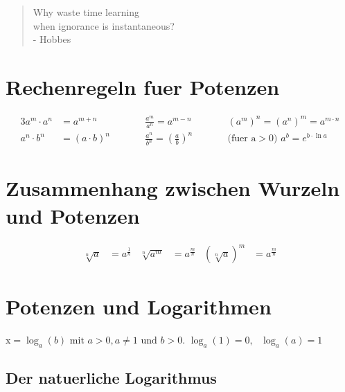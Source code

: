 \begin{quote}
Why waste time learning\\when ignorance is instantaneous?\\- Hobbes
\end{quote}

	\section{Rechenregeln fuer Potenzen}
				
			
			\begin{alignat*}{3}
				a^m \cdot a^n &= a^{m+n} &\quad\quad& \frac{a^m}{a^n} = a^{m-n} &\quad\quad& \left( a^m \right)^n = \left( a^n \right)^m = a^{m \cdot n} \\ 
				a^n \cdot b^n &= \left( a \cdot b \right)^n && \frac{a^n}{b^n} = \left( \frac{a}{b} \right)^n && \text{(fuer a} > \text{0) } a^b = e^{b \cdot \ln a}
			\end{alignat*}
	
	\vspace{10mm}
	\section{Zusammenhang zwischen Wurzeln und Potenzen}
		
	
			
			
			
			\begin{align*}
				\sqrt[n]{a} &= a^{\frac{1}{n}} & \sqrt[n]{a^m} &= a^{\frac{m}{n}} & \left(\sqrt[n]{a}\right)^m &= a^{ \frac{m}{n}}
			\end{align*}
	
	\newpage
	\section{Potenzen und Logarithmen}
	
	
			x\(=\log_a \left(b\right) \text{ mit } a > 0, a \neq 1 \text{ und } b > 0 \text{.}\)
			\newline
			\(\log_a \left(1\right) = 0, \text{ } \log_a \left( a \right) = 1\)
				
	\vspace{10mm}
	\subsection{Der natuerliche Logarithmus}
	
